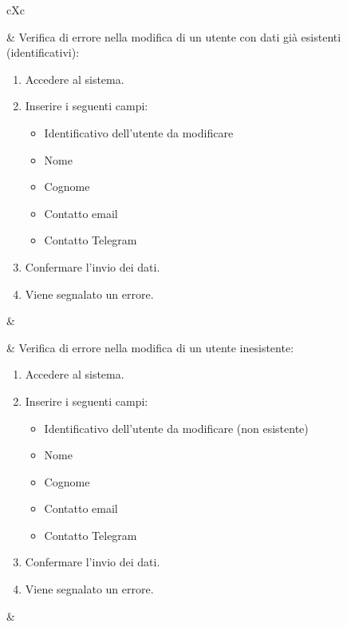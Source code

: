 \begin{table}[H]
	\begin{VTtable}[1.7]{\textwidth}{cXc}
        
        \addtotv & Verifica di errore nella modifica di un utente con dati già esistenti (identificativi):
		\begin{enumerate}
			\item Accedere al sistema.
            \item Inserire i seguenti campi:
                \begin{itemize}
                    \item Identificativo dell'utente da modificare
                    \item Nome
                    \item Cognome
                    \item Contatto email
                    \item Contatto Telegram
                \end{itemize}
            \item Confermare l'invio dei dati.
            \item Viene segnalato un errore.
		\end{enumerate}
		& \TNI \\\midrule
        
        \addtotv & Verifica di errore nella modifica di un utente inesistente:
		\begin{enumerate}
			\item Accedere al sistema.
            \item Inserire i seguenti campi:
                \begin{itemize}
                    \item Identificativo dell'utente da modificare (non esistente)
                    \item Nome
                    \item Cognome
                    \item Contatto email
                    \item Contatto Telegram
                \end{itemize}
            \item Confermare l'invio dei dati.
            \item Viene segnalato un errore.
		\end{enumerate}
		& \TNI \\\midrule
        

\end{VTtable}
\end{table}
